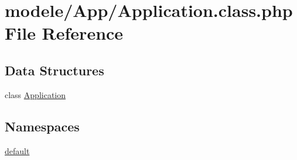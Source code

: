 \hypertarget{_application_8class_8php}{}\section{modele/\+App/\+Application.class.\+php File Reference}
\label{_application_8class_8php}
\subsection*{Data Structures}
\begin{DoxyCompactItemize}
\item 
class \hyperlink{class_application}{Application}
\end{DoxyCompactItemize}
\subsection*{Namespaces}
\begin{DoxyCompactItemize}
\item 
 \hyperlink{namespacedefault}{default}
\end{DoxyCompactItemize}
